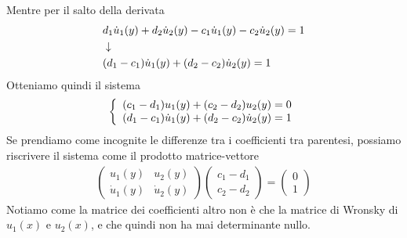 Mentre per il salto della derivata
\begin{align}
	&d_1 \dot{u}_1 (y) + d_2 \dot{u}_2 (y) - c_1 \dot{u}_1 (y) - c_2 \dot{u}_2 (y) = 1 \\ &\downarrow \nonumber \\
	&(d_1 - c_1)\dot{u}_1 (y) + (d_2 - c_2)\dot{u}_2 (y) = 1 
\end{align}
Otteniamo quindi il sistema
\begin{align}
	\left\{ \begin{array}{cc} (c_1 - d_1) u_1 (y) +(c_2 - d_2)u_2 (y) =0\\ (d_1 - c_1)\dot{u}_1 (y) + (d_2 - c_2)\dot{u}_2 (y) = 1 \end{array} \right.
\end{align}
Se prendiamo come incognite le differenze tra i coefficienti tra parentesi, possiamo riscrivere il sistema come il prodotto matrice-vettore
\begin{align}
	\begin{pmatrix}
		u_1 (y) & u_2 (y)\\
		\dot{u}_1 (y) & \dot{u}_2 (y)
	\end{pmatrix} \left( \begin{array}{c}
		c_1 - d_1\\
		c_2 - d_2
	\end{array} \right) = \left( \begin{array}{c}
		0\\
		1
	\end{array} \right)
\end{align}
Notiamo come la matrice dei coefficienti altro non è che la matrice di Wronsky di $u_1(x)$ e $u_2(x)$, e che quindi non ha mai determinante nullo. 


